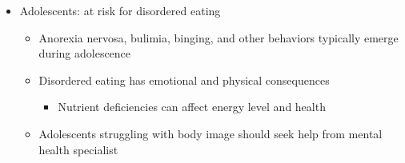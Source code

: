 \documentclass[12pt]{article}
\begin{document}
\begin{itemize}
\begin{itemize}
\begin{itemize}
                            \end{itemize}
                    \end{itemize}
                \item Adolescents: at risk for disordered eating
                    \begin{itemize}
                        \item Anorexia nervosa, bulimia, binging, and other behaviors typically emerge during adolescence
                        \item Disordered eating has emotional and physical consequences
                            \begin{itemize}
                                \item Nutrient deficiencies can affect energy level and health
                            \end{itemize}
                        \item Adolescents struggling with body image should seek help from mental health specialist
                    \end{itemize}
            \end{itemize}
\end{document}
